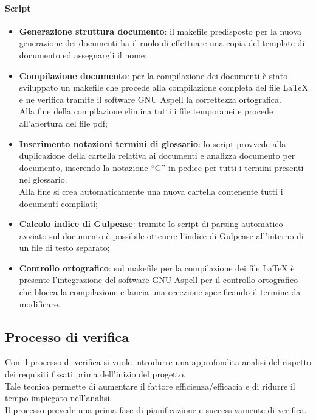 			\paragraph{Script} %
			\label{par:script_doc}
				\begin{itemize}
					\item \textbf{Generazione struttura documento}: il makefile predisposto per la nuova generazione dei documenti ha il ruolo di effettuare una copia del template di documento ed assegnargli il nome;
					\item \textbf{Compilazione documento}: per la compilazione dei documenti è stato sviluppato un makefile che procede alla compilazione completa del file \LaTeX{} e ne verifica tramite il software GNU Aspell la correttezza ortografica.\\
					Alla fine della compilazione elimina tutti i file temporanei e procede all'apertura del file pdf;
					\item \textbf{Inserimento notazioni termini di glossario}: lo script provvede alla duplicazione della cartella relativa ai documenti e analizza documento per documento, inserendo la notazione  ``G'' in pedice per tutti i termini presenti nel glossario. \\
					Alla fine si crea automaticamente una nuova cartella contenente tutti i documenti compilati;
					\item \textbf{Calcolo indice di Gulpease}: tramite lo script di parsing automatico avviato sul documento è possibile ottenere l'indice di Gulpease all'interno di un file di testo separato;
					\item \textbf{Controllo ortografico}: sul makefile per la compilazione dei file \LaTeX{} è presente l'integrazione del software GNU Aspell per il controllo ortografico che blocca la compilazione e lancia una eccezione specificando il termine da modificare.
				\end{itemize}



	\subsection{Processo di verifica}
	Con il processo di verifica si vuole introdurre una approfondita analisi del rispetto dei requisiti fissati prima dell'inizio del progetto.\\
	Tale tecnica permette di aumentare il fattore efficienza/efficacia e di ridurre il tempo impiegato nell'analisi.\\
	Il processo prevede una prima fase di pianificazione e successivamente di verifica.

